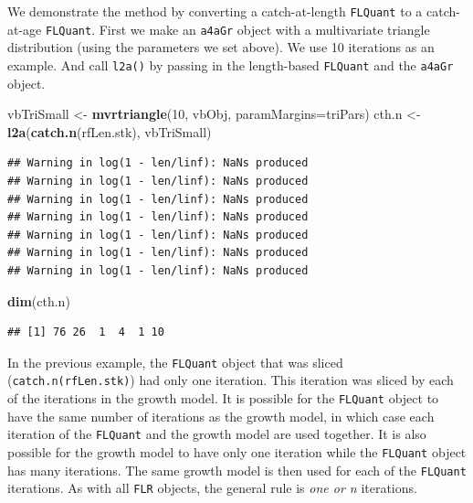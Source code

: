 \documentclass[
]{book}
\newenvironment{Shaded}{\begin{snugshade}}{\end{snugshade}}
\newcommand{\AttributeTok}[1]{\textcolor[rgb]{0.13,0.29,0.53}{#1}}
\newcommand{\DecValTok}[1]{\textcolor[rgb]{0.00,0.00,0.81}{#1}}
\newcommand{\FunctionTok}[1]{\textcolor[rgb]{0.13,0.29,0.53}{\textbf{#1}}}
\newcommand{\NormalTok}[1]{#1}
\newcommand{\OtherTok}[1]{\textcolor[rgb]{0.56,0.35,0.01}{#1}}
\begin{document}
We demonstrate the method by converting a catch-at-length \texttt{FLQuant} to a catch-at-age \texttt{FLQuant}. First we make an \texttt{a4aGr} object with a multivariate triangle distribution (using the parameters we set above). We use 10 iterations as an example. And call \texttt{l2a()} by passing in the length-based \texttt{FLQuant} and the \texttt{a4aGr} object.

\begin{Shaded}
\begin{Highlighting}[]
\NormalTok{vbTriSmall }\OtherTok{\textless{}{-}} \FunctionTok{mvrtriangle}\NormalTok{(}\DecValTok{10}\NormalTok{, vbObj, }\AttributeTok{paramMargins=}\NormalTok{triPars)}
\NormalTok{cth.n }\OtherTok{\textless{}{-}} \FunctionTok{l2a}\NormalTok{(}\FunctionTok{catch.n}\NormalTok{(rfLen.stk), vbTriSmall)}
\end{Highlighting}
\end{Shaded}

\begin{verbatim}
## Warning in log(1 - len/linf): NaNs produced
## Warning in log(1 - len/linf): NaNs produced
## Warning in log(1 - len/linf): NaNs produced
## Warning in log(1 - len/linf): NaNs produced
## Warning in log(1 - len/linf): NaNs produced
## Warning in log(1 - len/linf): NaNs produced
## Warning in log(1 - len/linf): NaNs produced
\end{verbatim}

\begin{Shaded}
\begin{Highlighting}[]
\FunctionTok{dim}\NormalTok{(cth.n)}
\end{Highlighting}
\end{Shaded}

\begin{verbatim}
## [1] 76 26  1  4  1 10
\end{verbatim}

In the previous example, the \texttt{FLQuant} object that was sliced (\texttt{catch.n(rfLen.stk)}) had only one iteration. This iteration was sliced by each of the iterations in the growth model. It is possible for the \texttt{FLQuant} object to have the same number of iterations as the growth model, in which case each iteration of the \texttt{FLQuant} and the growth model are used together. It is also possible for the growth model to have only one iteration while the \texttt{FLQuant} object has many iterations. The same growth model is then used for each of the \texttt{FLQuant} iterations. As with all \texttt{FLR} objects, the general rule is \emph{one or n} iterations.
\end{document}
